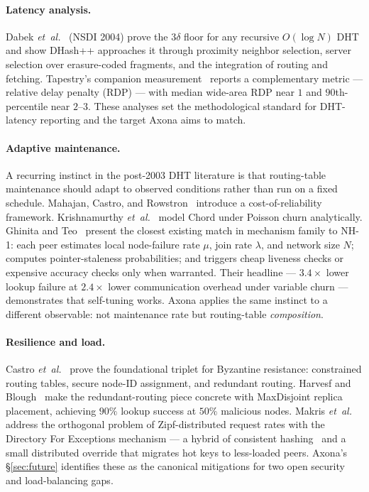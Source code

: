 \documentclass[conference]{IEEEtran}
\newcommand{\axona}{Axona\xspace}
\newcommand{\nhone}{NH-1\xspace}
\begin{document}
\paragraph{Latency analysis.}
Dabek \emph{et~al.}~\cite{dabek2004designing} (NSDI 2004) prove the $3\delta$
floor for any recursive $O(\log N)$ DHT and show DHash++ approaches it
through proximity neighbor selection, server selection over erasure-coded
fragments, and the integration of routing and fetching. Tapestry's
companion measurement~\cite{zhao2004tapestry} reports a complementary
metric --- relative delay penalty (RDP) --- with median wide-area RDP
near $1$ and $90$th-percentile near $2$--$3$. These analyses set the
methodological standard for DHT-latency reporting and the
target \axona aims to match.

\paragraph{Adaptive maintenance.}
A recurring instinct in the post-2003 DHT literature is that routing-table
maintenance should adapt to observed conditions rather than run on a
fixed schedule. Mahajan, Castro, and Rowstron~\cite{mahajan2003controlling}
introduce a cost-of-reliability framework. Krishnamurthy
\emph{et~al.}~\cite{krishnamurthy2005statistical} model Chord under Poisson
churn analytically. Ghinita and Teo~\cite{ghinita2006adaptive} present
the closest existing match in mechanism family to \nhone: each peer
estimates local node-failure rate $\mu$, join rate $\lambda$, and
network size $N$; computes pointer-staleness probabilities; and
triggers cheap liveness checks or expensive accuracy checks only when
warranted. Their headline --- $3.4\times$ lower lookup failure at
$2.4\times$ lower communication overhead under variable churn ---
demonstrates that self-tuning works. \axona applies the same instinct
to a different observable: not maintenance rate but routing-table
\emph{composition}.

\paragraph{Resilience and load.}
Castro \emph{et~al.}~\cite{castro2002secure} prove the foundational triplet
for Byzantine resistance: constrained routing tables, secure node-ID
assignment, and redundant routing. Harvesf and
Blough~\cite{harvesf2007design} make the redundant-routing piece
concrete with MaxDisjoint replica placement, achieving $90\%$ lookup
success at $50\%$ malicious nodes. Makris
\emph{et~al.}~\cite{makris2017novel} address the orthogonal problem of
Zipf-distributed request rates with the Directory For Exceptions
mechanism --- a hybrid of consistent hashing~\cite{karger1997consistent}
and a small distributed
override that migrates hot keys to less-loaded peers. \axona's
\S\ref{sec:future} identifies these as the canonical mitigations for
two open security and load-balancing gaps.
\end{document}
